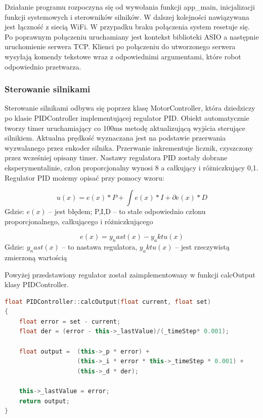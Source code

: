 Działanie programu rozpoczyna się od wywołania funkcji app\_main, inicjalizacji funkcji systemowych i sterowników silników.
W dalszej kolejności nawiązywana jest łączność z siecią WiFi. W przypadku braku połączenia system resetuje się. 
Po poprawnym połączeniu uruchamiany jest kontekst biblioteki ASIO a następnie uruchomienie serwera TCP.
Klienci po połączeniu do utworzonego serwera wysyłają komendy tekstowe wraz z odpowiednimi argumentami, które
robot odpowiednio przetwarza. 

\subsubsection{Sterowanie silnikami}
Sterowanie silnikami odbywa się poprzez klasę MotorController, która dziedziczy po klasie PIDController implementującej regulator PID.
Obiekt automatycznie tworzy timer uruchamiający co 100ms metodę aktualizującą wyjścia sterujące silnikiem. 
Aktualna prędkość wyznaczana jest na podstawie przerwania wyzwalanego przez enkoder silnika. Przerwanie inkrementuje licznik, 
czyszczony przez wcześniej opisany timer. Nastawy regulatora PID zostały dobrane eksperymentalinie, człon proporcjonalny wynosi 8 a całkujący i różniczkujący 0,1. 
Regulator PID możemy opisać przy pomocy wzoru:

\begin{equation}
	u(x) = e(x) * P + \int{e(x)} * I + \partial{e(x)} * D 
	\label{Eq:PID}
\end{equation}
Gdzie: $e(x)$ -- jest błędem; P,I,D -- to stałe odpowiednio członu proporcjonalnego, całkującego i różniczkującego

\begin{equation}
	e(x) = y_nast(x) - y_aktu(x)
	\label{Eq:blad}
\end{equation}
Gdzie: $y_nast(x)$ -- to nastawa regulatora, $y_aktu(x)$ -- jest rzeczywistą zmierzoną wartością
 
Powyżej przedstawiony regulator został zaimplementowany w funkcji calcOutput klasy PIDController.

\begin{lstlisting}[language=C++,caption=Zaimplementowany w C++ regulator PID,label={kodCPPPIDOutput}]
float PIDController::calcOutput(float current, float set)
{
	float error = set - current;
	float der = (error - this->_lastValue)/(_timeStep* 0.001);
	
	float output =  (this->_p * error) + 
					(this->_i * error * this->_timeStep * 0.001) + 
					(this->_d * der);

	this->_lastValue = error;
	return output;
}
\end{lstlisting}

